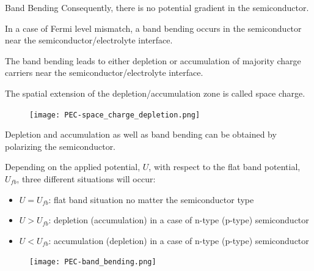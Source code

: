 \documentclass[10pt,compress,handout]{beamer}
\begin{document}
\begin{frame}[allowframebreaks=1.0]{Band Bending}
        Consequently, there is no potential gradient in the semiconductor. 
        
        In a case of Fermi level mismatch, a band bending occurs in the semiconductor 
        near the semiconductor/electrolyte interface.  
        
        \framebreak
        The band bending leads to either depletion or accumulation of majority 
        charge carriers near the semiconductor/electrolyte interface. 
        
        The spatial extension of the depletion/accumulation zone is called space 
        charge.
    
        \begin{figure}[H]
            \centering
            \texttt{[image: PEC-space\_charge\_depletion.png]}
            \label{fig_space_charge_depletion}
        \end{figure}

        \framebreak
        
        Depletion and accumulation as well as band bending can be obtained 
        by polarizing the semiconductor.
        
        Depending on the applied potential, $U$, with respect to the flat band 
        potential, $U_{fb}$, three different situations will occur:
        \begin{itemize}
            \item $U = U_{fb}$: flat band situation no matter the semiconductor type
            \item $U > U_{fb}$: depletion (accumulation) in a case of n-type (p-type) semiconductor  
            \item $U < U_{fb}$: accumulation (depletion) in a case of n-type (p-type) semiconductor
        \end{itemize}
        
        \begin{figure}[H]
        \centering
            \texttt{[image: PEC-band\_bending.png]}
            \label{fig_band_bending}
        \end{figure}
    

\end{frame}
\end{document}
